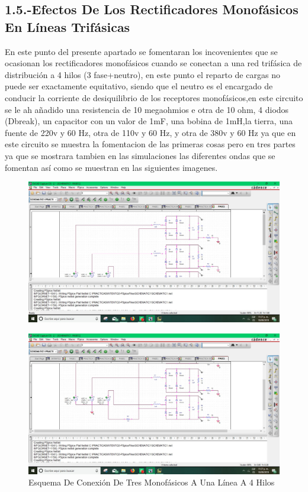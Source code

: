 \documentclass[10pt,a4paper]{article}
\begin{document}
\newpage
\subsection{1.5.-Efectos De Los Rectificadores Monofásicos En Líneas Trifásicas}
En este punto del presente apartado se fomentaran los incovenientes que se ocasionan los rectificadores monofásicos cuando se conectan a una red trifásica de distribución a 4 hilos (3 fase+neutro), en este punto el reparto de cargas no puede ser exactamente equitativo, siendo que el neutro es el encargado de conducir la corriente de desiquilibrio de los receptores monofásicos,en este circuito se le ah añadido una resistencia de 10 megaohmios e otra de 10 ohm, 4 diodos (Dbreak), un capacitor con un valor de 1mF, una bobina de 1mH,la tierra, una fuente de 220v y 60 Hz, otra de 110v y 60 Hz, y otra de 380v y 60 Hz ya que en este circuito se muestra la fomentacion de las primeras cosas pero en tres partes ya que se mostrara tambien en las simulaciones las diferentes ondas que se fomentan así como se muestran en las siguientes imagenes.
\begin{figure}[hbtp]
\centering
\includegraphics[scale=0.2]{005.jpeg}
\end{figure}
\begin{figure}[hbtp]
\centering
\includegraphics[scale=0.2]{05.jpeg}
\caption{Esquema De Conexión De Tres Monofásicos A Una Línea A 4 Hilos}
\end{figure}
\end{document}
